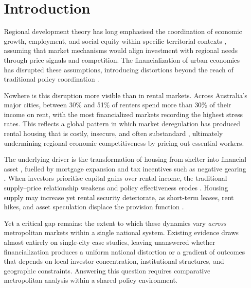 \documentclass[preprint,11pt,authoryear]{elsarticle}
\begin{document}
\section{Introduction}
\label{sec:introduction}

Regional development theory has long emphasised the coordination of
economic growth, employment, and social equity within specific
territorial contexts \citep{kuklinski1970regional}, assuming that
market mechanisms would align investment with regional needs through
price signals and competition. The financialization of urban economies
has disrupted these assumptions, introducing distortions beyond the
reach of traditional policy coordination
\citep{fernandez2016financialization, pike2019financialising}.

Nowhere is this disruption more visible than in rental markets.
Across Australia's major cities, between 30\% and 51\% of renters
spend more than 30\% of their income on rent, with the most
financialized markets recording the highest stress rates.
This reflects a global pattern in which market deregulation has
produced rental housing that is costly, insecure, and often
substandard \citep{mckee2017generation, waldron2023generation, bricocoli2024city},
ultimately undermining regional economic competitiveness by pricing
out essential workers.

The underlying driver is the transformation of housing from shelter
into financial asset \citep{stephens2024role}, fuelled by mortgage
expansion and tax incentives such as negative gearing \citep{vidal2024accommodating}.
When investors prioritise capital gains over rental income, the
traditional supply--price relationship weakens and policy
effectiveness erodes \citep{hulse2020everyman}. Housing supply may
increase yet rental security deteriorate, as short-term leases, rent
hikes, and asset speculation displace the provision function
\citep{fields2017unwilling, aalbers2021death}.

Yet a critical gap remains: the extent to which these dynamics vary
\textit{across} metropolitan markets within a single national system.
Existing evidence draws almost entirely on single-city case studies,
leaving unanswered whether financialization produces a uniform
national distortion or a gradient of outcomes that depends on local
investor concentration, institutional structures, and geographic
constraints. Answering this question requires comparative
metropolitan analysis within a shared policy environment.
\end{document}
